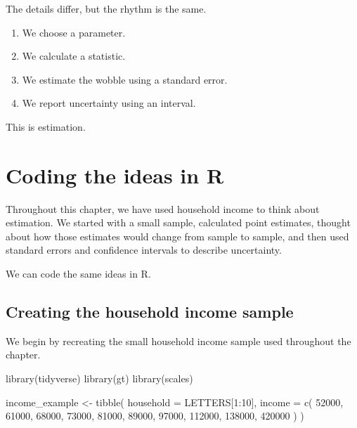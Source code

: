 \documentclass[
  letterpaper,
  DIV=11,
  numbers=noendperiod]{scrreprt}
\newenvironment{Shaded}{\begin{snugshade}}{\end{snugshade}}
\newcommand{\AttributeTok}[1]{\textcolor[rgb]{0.40,0.45,0.13}{#1}}
\newcommand{\DecValTok}[1]{\textcolor[rgb]{0.68,0.00,0.00}{#1}}
\newcommand{\FunctionTok}[1]{\textcolor[rgb]{0.28,0.35,0.67}{#1}}
\newcommand{\NormalTok}[1]{\textcolor[rgb]{0.00,0.23,0.31}{#1}}
\newcommand{\OtherTok}[1]{\textcolor[rgb]{0.00,0.23,0.31}{#1}}
\newcommand{\SpecialCharTok}[1]{\textcolor[rgb]{0.37,0.37,0.37}{#1}}
\providecommand{\tightlist}{%
  \setlength{\itemsep}{0pt}\setlength{\parskip}{0pt}}
\begin{document}
The details differ, but the rhythm is the same.

\begin{enumerate}
\def\labelenumi{\arabic{enumi}.}
\tightlist
\item
  We choose a parameter.
\item
  We calculate a statistic.
\item
  We estimate the wobble using a standard error.
\item
  We report uncertainty using an interval.
\end{enumerate}

This is estimation.

\section{Coding the ideas in R}\label{coding-the-ideas-in-r-3}

Throughout this chapter, we have used household income to think about
estimation. We started with a small sample, calculated point estimates,
thought about how those estimates would change from sample to sample,
and then used standard errors and confidence intervals to describe
uncertainty.

We can code the same ideas in R.

\subsection{Creating the household income
sample}\label{creating-the-household-income-sample}

We begin by recreating the small household income sample used throughout
the chapter.

\begin{Shaded}
\begin{Highlighting}[]
\FunctionTok{library}\NormalTok{(tidyverse)}
\FunctionTok{library}\NormalTok{(gt)}
\FunctionTok{library}\NormalTok{(scales)}

\NormalTok{income\_example }\OtherTok{\textless{}{-}} \FunctionTok{tibble}\NormalTok{(}
  \AttributeTok{household =}\NormalTok{ LETTERS[}\DecValTok{1}\SpecialCharTok{:}\DecValTok{10}\NormalTok{],}
  \AttributeTok{income =} \FunctionTok{c}\NormalTok{(}
    \DecValTok{52000}\NormalTok{, }\DecValTok{61000}\NormalTok{, }\DecValTok{68000}\NormalTok{, }\DecValTok{73000}\NormalTok{, }\DecValTok{81000}\NormalTok{,}
    \DecValTok{89000}\NormalTok{, }\DecValTok{97000}\NormalTok{, }\DecValTok{112000}\NormalTok{, }\DecValTok{138000}\NormalTok{, }\DecValTok{420000}
\NormalTok{  )}
\NormalTok{)}
\end{Highlighting}
\end{Shaded}
\end{document}
